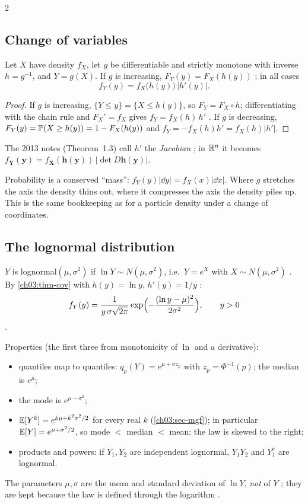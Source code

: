 \begin{paracol}{2}
\subsection{Change of variables}
\begin{theorem}\label{ch03:thm-cov}
Let $X$ have density $f_X$, let $g$ be differentiable and strictly monotone with inverse $h=g^{-1}$, and
$Y=g(X)$. If $g$ is increasing, $F_Y(y)=F_X(h(y))$ ; in all cases
\[
  f_Y(y)=f_X\bigl(h(y)\bigr)\,\bigl|h'(y)\bigr| .
\]
\end{theorem}
\begin{proof}
If $g$ is increasing, $\{Y\le y\}=\{X\le h(y)\}$, so $F_Y=F_X\circ h$; differentiating with the chain rule and
$F_X'=f_X$ gives $f_Y=f_X(h)\,h'$ . If $g$ is decreasing, $F_Y(y)=\mathbb{P}(X\ge h(y))=1-F_X(h(y))$
and $f_Y=-f_X(h)h'=f_X(h)|h'|$.
\end{proof}
The 2013 notes (Theorem~1.3) call $h'$ the \emph{Jacobian} ; in $\mathbb{R}^n$ it becomes
$f_{\bm Y}(\bm y)=f_{\bm X}(\bm h(\bm y))\,|\det D\bm h(\bm y)|$.

\begin{intuition}
Probability is a conserved ``mass'': $f_Y(y)|\dd y|=f_X(x)|\dd x|$. Where $g$ stretches the axis the density
thins out, where it compresses the axis the density piles up. This is the same bookkeeping as for a
particle density under a change of coordinates.
\end{intuition}

\subsection{The lognormal distribution}
\begin{definition}
$Y$ is lognormal$(\mu,\sigma^2)$ if $\ln Y\sim N(\mu,\sigma^2)$, i.e.\ $Y=e^X$ with $X\sim N(\mu,\sigma^2)$
. By \cref{ch03:thm-cov} with $h(y)=\ln y$, $h'(y)=1/y$ :
\[
  f_Y(y)=\frac{1}{y\,\sigma\sqrt{2\pi}}\exp\Bigl(-\frac{(\ln y-\mu)^2}{2\sigma^2}\Bigr),\qquad y>0
\]
.
\end{definition}

\noindent Properties (the first three from monotonicity of $\ln$ and a derivative):
\begin{itemize}
  \item quantiles map to quantiles: $q_p(Y)=e^{\mu+\sigma z_p}$ with $z_p=\Phi^{-1}(p)$; the median is $e^\mu$;
  \item the mode is $e^{\mu-\sigma^2}$;
  \item $\mathbb{E}[Y^k]=e^{k\mu+k^2\sigma^2/2}$ for every real $k$ (\cref{ch03:sec-mgf}); in particular
        $\mathbb{E} [Y]=e^{\mu+\sigma^2/2}$, so mode $<$ median $<$ mean: the law is skewed to the right;
  \item products and powers: if $Y_1,Y_2$ are independent lognormal, $Y_1Y_2$ and $Y_1^c$ are lognormal.
\end{itemize}
The parameters $\mu,\sigma$ are the mean and standard deviation of $\ln Y$, \emph{not} of $Y$
; they are kept because the law is defined through the logarithm .


\end{paracol}
